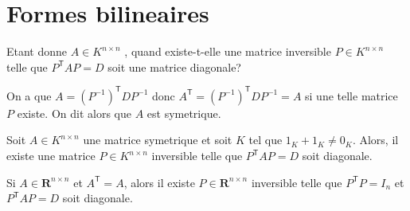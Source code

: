 
\chapter{Formes bilineaires}

\begin{question}
Etant donne $A\in K^{n\times n}$ , quand existe-t-elle une matrice inversible $P\in K^{n\times n}$ telle que $P^{\mathsf{T}}AP=D$ soit une matrice diagonale?
\end{question}
\begin{answer}
On a que $A=(P^{-1})^{\mathsf{T}}DP^{-1}$ donc $A^{\mathsf{T}}=(P^{-1})^{\mathsf{T}}DP^{-1}=A$ si une telle matrice $P$ existe. On dit alors que $A$ est symetrique.
\end{answer}
\begin{theorem}
Soit $A\in K^{n\times n}$ une matrice symetrique et soit $K$ tel que $1_{K}+1_{K}\neq 0_{K}$. Alors, il existe une matrice $P\in K^{n\times n}$ inversible telle que $P^{\mathsf{T}}AP=D$ soit diagonale.
\end{theorem}
\begin{theorem}
Si $A\in \mathbf{R}^{n\times n}$ et $A^{\mathsf{T}}=A$, alors il existe $P\in \mathbf{R}^{n\times n}$ inversible telle que $P^{\mathsf{T}}P=I_{n}$ et $P^{\mathsf{T}}AP=D$ soit diagonale.
\end{theorem}

